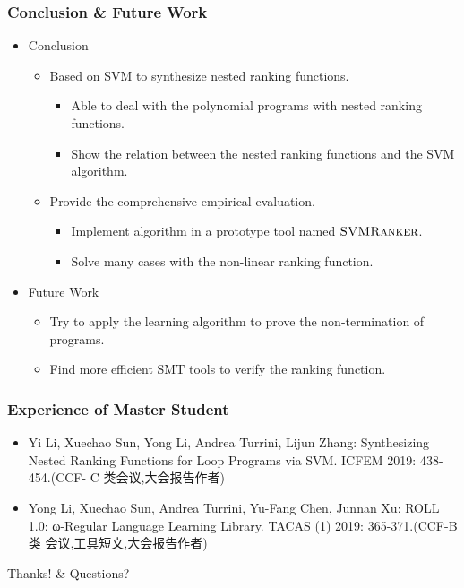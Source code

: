 \begin{frame}
\frametitle{Conclusion \& Future Work}
\begin{itemize}
\item Conclusion

\begin{itemize}
\item Based on SVM to synthesize nested ranking functions.
\begin{itemize}
\item Able to deal with the polynomial programs with nested ranking functions. 
\item Show the relation between the nested ranking functions and the SVM algorithm.
\end{itemize}
\item Provide the comprehensive empirical evaluation.
\begin{itemize}
\item Implement algorithm in a prototype tool named $\textsc{SVMRanker}$.
\item Solve many cases with the non-linear ranking function.
\end{itemize}
\end{itemize}

\item Future Work

\begin{itemize}
\item Try to apply the learning algorithm to prove the non-termination of programs.
\item Find more efficient SMT tools to verify the ranking function.
\end{itemize}

\end{itemize}
\end{frame}

\begin{frame}
\frametitle{Experience of Master Student}
\begin{itemize}
\item Yi Li, {\red Xuechao Sun}, Yong Li, Andrea Turrini, Lijun Zhang: Synthesizing Nested
Ranking Functions for Loop Programs via SVM. ICFEM 2019: 438-454.(CCF-
C 类会议,大会报告作者)

\item Yong Li, {\red Xuechao Sun}, Andrea Turrini, Yu-Fang Chen, Junnan Xu: ROLL 1.0:
ω-Regular Language Learning Library. TACAS (1) 2019: 365-371.(CCF-B 类
会议,工具短文,大会报告作者)


\end{itemize}
\end{frame}

\begin{frame}
\begin{center}
\Large Thanks! \& Questions?
\end{center}
\end{frame}





